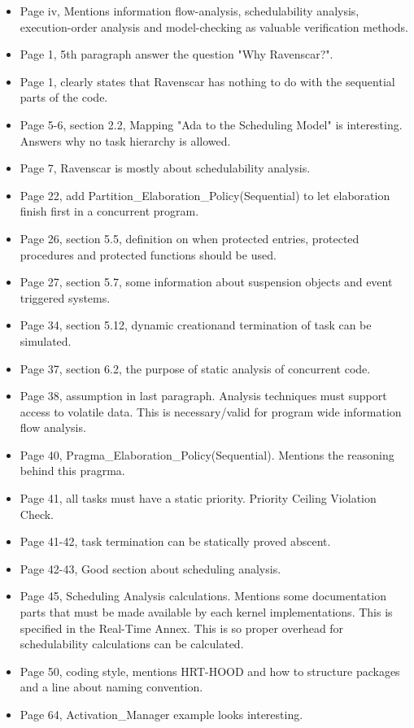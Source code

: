 \begin{itemize}
    \item Page iv, Mentions information flow-analysis, schedulability analysis,
        execution-order analysis and model-checking as valuable verification
        methods.
    \item Page 1, 5th paragraph answer the question "Why Ravenscar?".
    \item Page 1, clearly states that Ravenscar has nothing to do with the
        sequential parts of the code.
    \item Page 5-6, section 2.2, Mapping "Ada to the Scheduling Model" is
        interesting. Answers why no task hierarchy is allowed.
    \item Page 7, Ravenscar is mostly about schedulability analysis.
    \item Page 22, add Partition\_Elaboration\_Policy(Sequential) to let
        elaboration finish first in a concurrent program.
    \item Page 26, section 5.5, definition on when protected entries, protected
        procedures and protected functions should be used.
    \item Page 27, section 5.7, some information about suspension objects and
        event triggered systems.
    \item Page 34, section 5.12, dynamic creationand termination of task can be
        simulated.
    \item Page 37, section 6.2, the purpose of static analysis of concurrent
        code.
    \item Page 38, assumption in last paragraph. Analysis techniques must
        support access to volatile data. This is necessary/valid for program
        wide information flow analysis.
    \item Page 40, Pragma\_Elaboration\_Policy(Sequential). Mentions the
        reasoning behind this pragrma.
    \item Page 41, all tasks must have a static priority. Priority Ceiling
        Violation Check.
    \item Page 41-42, task termination can be statically proved abscent.
    \item Page 42-43, Good section about scheduling analysis.
    \item Page 45, Scheduling Analysis calculations. Mentions some
        documentation parts that must be made available by each kernel
        implementations. This is specified in the Real-Time Annex. This is so
        proper overhead for schedulability calculations can be calculated.
    \item Page 50, coding style, mentions HRT-HOOD and how to structure
        packages and a line about naming convention.
    \item Page 64, Activation\_Manager example looks interesting.
\end{itemize}

